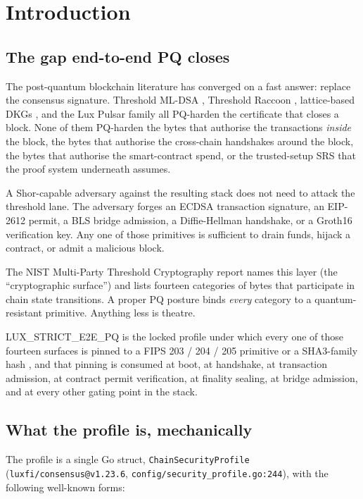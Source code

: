 \section{Introduction}
\label{sec:intro}

\subsection{The gap end-to-end PQ closes}

The post-quantum blockchain literature has converged on a fast answer: replace
the consensus signature. Threshold ML-DSA \cite{tmldsa2025}, Threshold Raccoon
\cite{thresholdraccoon}, lattice-based DKGs \cite{krt24,gks24}, and the Lux
Pulsar family \cite{lp073} all PQ-harden the certificate that closes a block.
None of them PQ-harden the bytes that authorise the transactions \emph{inside}
the block, the bytes that authorise the cross-chain handshakes around the
block, the bytes that authorise the smart-contract spend, or the trusted-setup
SRS that the proof system underneath assumes.

A Shor-capable adversary against the resulting stack does not need to attack
the threshold lane. The adversary forges an ECDSA transaction signature, an
EIP-2612 permit, a BLS bridge admission, a Diffie-Hellman handshake, or a
Groth16 verification key. Any one of those primitives is sufficient to drain
funds, hijack a contract, or admit a malicious block.

The NIST Multi-Party Threshold Cryptography report
\cite{nistir8214c} names this layer (the ``cryptographic surface'') and lists
fourteen categories of bytes that participate in chain state transitions. A
proper PQ posture binds \emph{every} category to a quantum-resistant primitive.
Anything less is theatre.

LUX\_STRICT\_E2E\_PQ is the locked profile under which every one of those
fourteen surfaces is pinned to a FIPS 203 / 204 / 205 primitive
\cite{fips203,fips204,fips205} or a SHA3-family hash
\cite{fips202,sp800185}, and that pinning is consumed at boot, at handshake,
at transaction admission, at contract permit verification, at finality
sealing, at bridge admission, and at every other gating point in the stack.

\subsection{What the profile is, mechanically}

The profile is a single Go struct, \texttt{ChainSecurityProfile}
(\texttt{luxfi/consensus@v1.23.6}, \texttt{config/security\_profile.go:244}),
with the following well-known forms:


